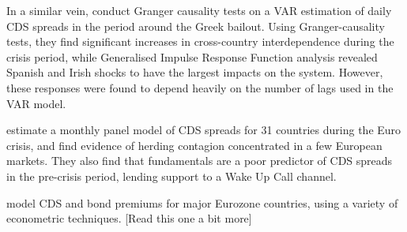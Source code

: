 \documentclass[../base.tex]{subfiles}
\begin{document}
In a similar vein,  \cite{kalbaska2012eurozone}conduct Granger causality tests on a VAR estimation of daily CDS spreads in the period around the Greek bailout. Using Granger-causality tests, they find significant increases in cross-country interdependence during the crisis period, while Generalised Impulse Response Function analysis revealed Spanish and Irish shocks to have the largest impacts on the system. However, these responses were found to depend heavily on the number of lags used in the VAR model.

\cite{beirne2013pricing} estimate a monthly panel model of CDS spreads for 31 countries during the Euro crisis, and find evidence of herding contagion concentrated in a few European markets. They also find that fundamentals are a poor predictor of CDS spreads in the pre-crisis period, lending support to a Wake Up Call channel.

\cite{caporin2013measuring} model CDS and bond premiums for major Eurozone countries, using a variety of econometric techniques. [Read this one a bit more]
\end{document}
